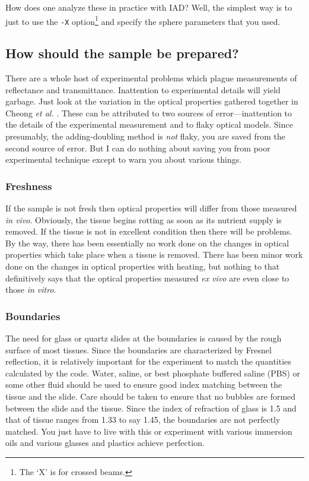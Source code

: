 \documentclass{article}
\begin{document}
How does one analyze these in practice with IAD?  Well, the simplest way is to just
to use the \texttt{-X} option\footnote{The `X' is for crossed beams.} and specify
the sphere parameters that you used.

\subsection{How should the sample be prepared?}

There are a whole host of experimental problems which plague measurements
of reflectance and transmittance.  Inattention to experimental details will yield
garbage.  Just look at the variation in the optical properties
gathered together in Cheong \emph{et al.} \cite{cheong90a}.  These can be attributed
to two sources of error---inattention to the details of the experimental
measurement and to flaky optical models.  Since presumably, the adding-doubling
method is \textit{not} flaky, you are saved from the second source of error.  
But I can do nothing about saving you from poor experimental technique
except to warn you about various things.  

\subsubsection{Freshness}
If the sample is not fresh then optical properties will differ from those
measured {\it in vivo}.  Obviously, the tissue begins rotting as soon as
its nutrient supply is removed. If the tissue is not in excellent condition then
there will be problems.  By the way, there has been essentially no work
done on the changes in optical properties which take place when a tissue
is removed.  There has been minor work done on the changes in optical
properties with heating, but nothing to that definitively says that the
optical properties measured \textit{ex vivo} are even close to those 
\textit{in vitro}.  

\subsubsection{Boundaries}
The need for glass or quartz slides at the boundaries is caused by
the rough surface of most tissues.  Since the boundaries are characterized
by Fresnel reflection, it is relatively important for the experiment to
match the quantities calculated by the code.  Water, saline, or best
phosphate buffered saline (PBS) or some
other fluid should be used to ensure good index matching between
the tissue and the slide.  Care should be taken to ensure that no bubbles 
are formed between
the slide and the tissue.   Since the index of refraction
of glass is 1.5 and that of tissue ranges from 1.33 to say 1.45, the 
boundaries are not perfectly matched.  You just have to live with this
or experiment with various immersion oils and various glasses and plastics
achieve perfection.  
\end{document}
